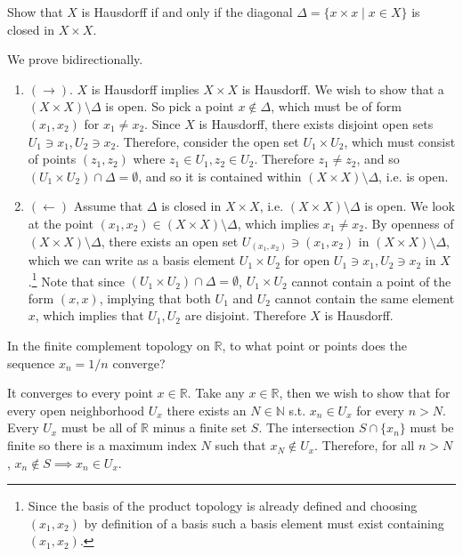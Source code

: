   \begin{exercise}[Munkres 17.13]
    Show that $X$ is Hausdorff if and only if the diagonal $\Delta = \{x \times x \mid x \in X\}$ is closed in $X \times X$.
  \end{exercise}
  \begin{solution}
    We prove bidirectionally. 
    \begin{enumerate}
      \item $(\rightarrow)$. $X$ is Hausdorff implies $X \times X$ is Hausdorff. We wish to show that a $(X \times X) \setminus \Delta$ is open. So pick a point $x \not\in \Delta$, which must be of form $(x_1, x_2)$ for $x_1 \neq x_2$. Since $X$ is Hausdorff, there exists disjoint open sets $U_1 \ni x_1, U_2 \ni x_2$. Therefore, consider the open set $U_1 \times U_2$, which must consist of points $(z_1, z_2)$ where $z_1 \in U_1, z_2 \in U_2$. Therefore $z_1 \neq z_2$, and so $(U_1 \times U_2) \cap \Delta = \emptyset$, and so it is contained within $(X \times X) \setminus \Delta$, i.e. is open. 

      \item $(\leftarrow)$ Assume that $\Delta$ is closed in $X \times X$, i.e. $(X \times X) \setminus \Delta$ is open. We look at the point $(x_1, x_2) \in (X \times X) \setminus \Delta$, which implies $x_1 \neq x_2$. By openness of $(X \times X) \setminus \Delta$, there exists an open set $U_{(x_1, x_2)} \ni (x_1, x_2)$ in $(X \times X) \setminus \Delta$, which we can write as a basis element $U_1 \times U_2$ for open $U_1 \ni x_1, U_2 \ni x_2$ in $X$.\footnote{Since the basis of the product topology is already defined and choosing $(x_1, x_2)$ by definition of a basis such a basis element must exist containing $(x_1, x_2)$.} Note that since $(U_1 \times U_2) \cap \Delta = \emptyset$, $U_1 \times U_2$ cannot contain a point of the form $(x, x)$, implying that both $U_1$ and $U_2$ cannot contain the same element $x$, which implies that $U_1, U_2$ are disjoint. Therefore $X$ is Hausdorff. 
    \end{enumerate} 

  \end{solution}

  \begin{exercise}[Munkres 17.14]
    In the finite complement topology on $\mathbb{R}$, to what point or points does the sequence $x_n = 1/n$ converge?
  \end{exercise}
  \begin{solution}
    It converges to every point $x \in \mathbb{R}$. Take any $x \in \mathbb{R}$, then we wish to show that for every open neighborhood $U_x$ there exists an $N \in \mathbb{N}$ s.t. $x_n \in U_x$ for every $n > N$. Every $U_x$ must be all of $\mathbb{R}$ minus a finite set $S$. The intersection $S \cap \{x_n\}$ must be finite so there is a maximum index $N$ such that $x_N \not\in U_x$. Therefore, for all $n > N$, $x_n \not\in S \implies x_n \in U_x$. 
  \end{solution}

